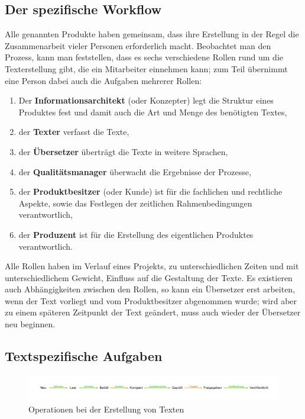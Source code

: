 \subsection{Der spezifische Workflow}\label{l:workflow}



Alle genannten Produkte haben gemeinsam, dass ihre Erstellung in der Regel die Zusammenarbeit vieler Personen erforderlich macht. Beobachtet man den Prozess, kann man feststellen, dass es sechs verschiedene Rollen rund um die Texterstellung gibt, die ein Mitarbeiter einnehmen kann; zum Teil übernimmt eine Person dabei auch die Aufgaben mehrerer Rollen:


\begin{enumerate}
\item{Der \textbf{Informationsarchitekt} (oder Konzepter) legt die Struktur eines Produktes fest und damit auch die Art und Menge des benötigten Textes,}
\item{der \textbf{Texter} verfasst die Texte,}
\item{der \textbf{Übersetzer} überträgt die Texte in weitere Sprachen,}
\item{der \textbf{Qualitätsmanager} überwacht die Ergebnisse der Prozesse,}
\item{der \textbf{Produktbesitzer} (oder Kunde) ist für die fachlichen und rechtliche Aspekte, sowie das Festlegen der zeitlichen Rahmenbedingungen verantwortlich,}
\item{der \textbf{Produzent} ist für die Erstellung des eigentlichen Produktes verantwortlich.}
\end{enumerate}

Alle Rollen haben im Verlauf eines Projekts, zu unterschiedlichen Zeiten und mit unterschiedlichem Gewicht, Einfluss auf die Gestaltung der Texte. Es existieren auch Abhängigkeiten zwischen den Rollen, so kann ein Übersetzer erst arbeiten, wenn der Text vorliegt und vom Produktbesitzer abgenommen wurde; wird aber zu einem späteren Zeitpunkt der Text geändert, muss auch wieder der Übersetzer neu beginnen.






\subsection{Textspezifische Aufgaben}

\begin{figure}[htb]
\begin{center}
\includegraphics[width=\textwidth]{media/chart-3.pdf}
\end{center}
\caption{Operationen bei der Erstellung von Texten}
\label{chart:3}
\end{figure}

